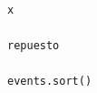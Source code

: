 \documentclass[10pt,a4paper]{article} %
\begin{document}
\begin{lstlisting}
                                                                                                                                                                                                                                                                                                                                                                                                                                                                                                                                                                                                                                                                                                                                                                                                                                                                                                                                                                        x
                                                                                                                                                                                                                                                                                                                                                                                                                                                                                                                                                                                                                                                                                                                                                                                                                                                                                                                                                                        repuesto
                                                                                                                                                                                                                                                                                                                                                                                                                                                                                                                                                                                                                                                                                                                                                                                                                                                                                                                                                                                        events.sort()

\end{lstlisting}
\end{document}
